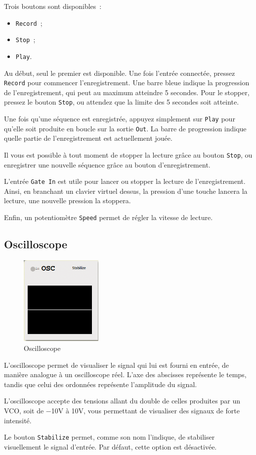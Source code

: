 \documentclass[a4paper,oneside,frenchb,10pt]{article}
\begin{document}
Trois boutons sont disponibles~:

\begin{itemize}
\item
  \verb!Record!~;
\item
  \verb!Stop!~;
\item
  \verb!Play!.
\end{itemize}

Au début, seul le premier est disponible. Une fois l'entrée connectée,
pressez \verb!Record! pour commencer l'enregistrement. Une barre bleue
indique la progression de l'enregistrement, qui peut au maximum
atteindre 5 secondes. Pour le stopper, pressez le bouton \verb!Stop!, ou
attendez que la limite des 5 secondes soit atteinte.

Une fois qu'une séquence est enregistrée, appuyez simplement sur
\verb!Play! pour qu'elle soit produite en boucle sur la sortie
\verb!Out!. La barre de progression indique quelle partie de
l'enregistrement est actuellement jouée.

Il vous est possible à tout moment de stopper la lecture grâce au bouton
\verb!Stop!, ou enregistrer une nouvelle séquence grâce au bouton
d'enregistrement.

L'entrée \verb!Gate In! est utile pour lancer ou stopper la lecture de
l'enregistrement. Ainsi, en branchant un clavier virtuel dessus, la
pression d'une touche lancera la lecture, une nouvelle pression la
stoppera.

Enfin, un potentiomètre \verb!Speed! permet de régler la vitesse de
lecture.

\subsection{Oscilloscope}

\begin{multicols}{2}
\begin{figure}[H]
\centering
\includegraphics[width=4cm]{../img/png/oscilloscope.png}
\caption{Oscilloscope}
\end{figure}

L'oscilloscope permet de visualiser le signal qui lui est fourni en
entrée, de manière analogue à un oscilloscope réel. L'axe des abscisses
représente le temps, tandis que celui des ordonnées représente
l'amplitude du signal.

L'oscilloscope accepte des tensions allant du double de celles produites
par un VCO, soit de −10V à 10V, vous permettant de visualiser des
signaux de forte intensité.

Le bouton \verb!Stabilize! permet, comme son nom l'indique, de
stabiliser visuellement le signal d'entrée. Par défaut, cette option est
désactivée.
\end{multicols}
\end{document}

